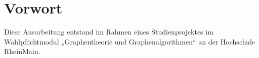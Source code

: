\chapter*{Vorwort}
Diese Ausarbeitung entstand im Rahmen eines Studienprojektes im Wahlpflichtmodul
„Graphentheorie und Graphenalgorithmen“ an der Hochschule RheinMain.
